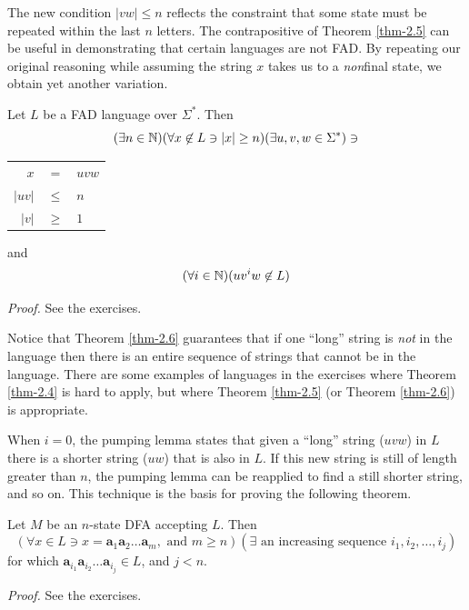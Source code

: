 The new condition $|vw| \leq n$ reflects the constraint that some state must be
repeated within the last $n$ letters. The contrapositive of Theorem \ref{thm-2.5} can be
useful in demonstrating that certain languages are not FAD. By repeating our
original reasoning while assuming the string $x$ takes us to a \emph{non}final state,
we obtain yet another variation.

\begin{thm}\label{thm-2.6}
Let $L$ be a FAD language over $\Sigma^*$. Then
\[ (\exists n \in \mathbb{N})(\forall x \not \in L \ni |x| \geq n)(\exists u,v,w \in
	\Sigma^*) \ni \]
\begin{center}\begin{tabular}{rcl}
$x$ & $=$ & $uvw$ \\
$|uv|$ & $\leq$ & $n$ \\
$|v|$ & $\geq$ & $1$ \\
\end{tabular}\end{center}
and
\[ (\forall i \in \mathbb{N})(uv^iw \not \in L) \]

\emph{Proof.} See the exercises.
\end{thm}

Notice that Theorem \ref{thm-2.6} guarantees that if one ``long'' string is
\emph{not} in the
language then there is an entire sequence of strings that cannot be in the
language. There are some examples of languages in the exercises where Theorem
\ref{thm-2.4} is hard to apply, but where Theorem \ref{thm-2.5} (or Theorem \ref{thm-2.6}) is appropriate.

When $i = 0$, the pumping lemma states that given a ``long'' string ($uvw$) in
$L$ there is a shorter string ($uw$) that is also in $L$. If this new string is
still of length greater than $n$, the pumping lemma can be reapplied to find a
still shorter string, and so on. This technique is the basis for proving the
following theorem.

\begin{thm}\label{thm-2.7}
Let $M$ be an $n$-state DFA accepting $L$. Then
\[ (\forall x \in L \ni x = \pmb{a}_1\pmb{a}_2 \ldots \pmb{a}_m,\text{ and }m
	\geq n)(\exists\text{ an increasing sequence }i_1,i_2, \ldots ,i_j) \]
for which $\pmb{a}_{i_1}\pmb{a}_{i_2} \ldots \pmb{a}_{i_j} \in L$, and $j < n$.

\emph{Proof.} See the exercises.
\end{thm}

